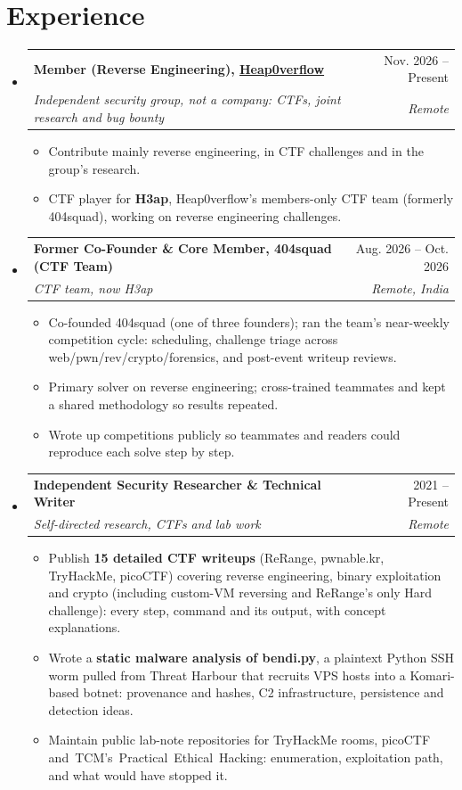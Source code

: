 \documentclass[letterpaper,11pt]{article}
\makeatletter
\newcommand{\resumeItem}[1]{
  \item\small{
    {#1\vspace{-2pt}}
  }
}
\newcommand{\resumeSubheading}[4]{
  \vspace{-2pt}\item
    \begin{tabular*}{\linewidth}[t]{l@{\extracolsep{\fill}}r}
      \textbf{#1} & #2 \\
      \textit{\small#3} & \textit{\small#4} \\
    \end{tabular*}\vspace{-7pt}
}
\newcommand{\resumeSubHeadingListStart}{\begin{itemize}[leftmargin=0.15in, label={}]}
\newcommand{\resumeSubHeadingListEnd}{\end{itemize}}
\newcommand{\resumeItemListStart}{\begin{itemize}}
\newcommand{\resumeItemListEnd}{\end{itemize}\vspace{-5pt}}
\makeatother
\begin{document}
\section{Experience}
  \resumeSubHeadingListStart

    \resumeSubheading
      {Member (Reverse Engineering), \href{https://aaadarsh1337.github.io/heap0verflow/}{Heap0verflow}}{Nov. 2026 -- Present}
      {Independent security group, not a company: CTFs, joint research and bug bounty}{Remote}
      \resumeItemListStart
        \resumeItem{Contribute mainly reverse engineering, in CTF challenges and in the group's research.}
        \resumeItem{CTF player for \textbf{H3ap}, Heap0verflow's members-only CTF team (formerly 404squad), working on reverse engineering challenges.}
      \resumeItemListEnd

    \resumeSubheading
      {Former Co-Founder \& Core Member, 404squad (CTF Team)}{Aug. 2026 -- Oct. 2026}
      {CTF team, now H3ap}{Remote, India}
      \resumeItemListStart
        \resumeItem{Co-founded 404squad (one of three founders); ran the team's near-weekly competition cycle: scheduling, challenge triage across web/pwn/rev/crypto/forensics, and post-event writeup reviews.}
        \resumeItem{Primary solver on reverse engineering; cross-trained teammates and kept a shared methodology so results repeated.}
        \resumeItem{Wrote up competitions publicly so teammates and readers could reproduce each solve step by step.}
      \resumeItemListEnd

    \resumeSubheading
      {Independent Security Researcher \& Technical Writer}{2021 -- Present}
      {Self-directed research, CTFs and lab work}{Remote}
      \resumeItemListStart
        \resumeItem{Publish \textbf{15 detailed CTF writeups} (ReRange, pwnable.kr, TryHackMe, picoCTF) covering reverse engineering, binary exploitation and crypto (including custom-VM reversing and ReRange's only Hard challenge): every step, command and its output, with concept explanations.}
        \resumeItem{Wrote a \textbf{static malware analysis of bendi.py}, a plaintext Python SSH worm pulled from Threat Harbour that recruits VPS hosts into a Komari-based botnet: provenance and hashes, C2 infrastructure, persistence and detection ideas.}
        \resumeItem{Maintain public lab-note repositories for TryHackMe rooms, picoCTF \mbox{and TCM's Practical Ethical Hacking}: enumeration, exploitation path, and what would have stopped it.}
      \resumeItemListEnd

  \resumeSubHeadingListEnd
\end{document}
